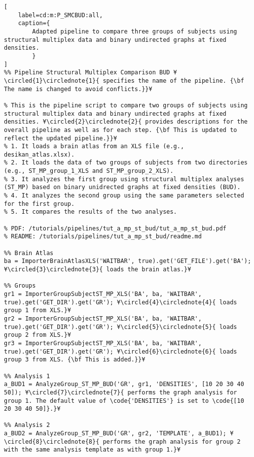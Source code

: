 \documentclass{tufte-handout}
\begin{document}
\begin{lstlisting}[
	label=cd:m:P_SMCBUD:all,
	caption={
		Adapted pipeline to compare three groups of subjects using structural multiplex data and binary undirected graphs at fixed densities.
		}
]
%% Pipeline Structural Multiplex Comparison BUD ¥\circled{1}\circlednote{1}{ specifies the name of the pipeline. {\bf The name is changed to avoid conflicts.}}¥

% This is the pipeline script to compare two groups of subjects using structural multiplex data and binary undirected graphs at fixed densities. ¥\circled{2}\circlednote{2}{ provides descriptions for the overall pipeline as well as for each step. {\bf This is updated to reflect the updated pipeline.}}¥
% 1. It loads a brain atlas from an XLS file (e.g., desikan_atlas.xlsx).
% 2. It loads the data of two groups of subjects from two directories (e.g., ST_MP_group_1_XLS and ST_MP_group_2_XLS).
% 3. It analyzes the first group using structural multiplex analyses (ST_MP) based on binary unidrected graphs at fixed densities (BUD).
% 4. It analyzes the second group using the same parameters selected for the first group.
% 5. It compares the results of the two analyses.

% PDF: /tutorials/pipelines/tut_a_mp_st_bud/tut_a_mp_st_bud.pdf
% README: /tutorials/pipelines/tut_a_mp_st_bud/readme.md

%% Brain Atlas
ba = ImporterBrainAtlasXLS('WAITBAR', true).get('GET_FILE').get('BA'); ¥\circled{3}\circlednote{3}{ loads the brain atlas.}¥

%% Groups
gr1 = ImporterGroupSubjectST_MP_XLS('BA', ba, 'WAITBAR', true).get('GET_DIR').get('GR'); ¥\circled{4}\circlednote{4}{ loads group 1 from XLS.}¥
gr2 = ImporterGroupSubjectST_MP_XLS('BA', ba, 'WAITBAR', true).get('GET_DIR').get('GR'); ¥\circled{5}\circlednote{5}{ loads group 2 from XLS.}¥
gr3 = ImporterGroupSubjectST_MP_XLS('BA', ba, 'WAITBAR', true).get('GET_DIR').get('GR'); ¥\circled{6}\circlednote{6}{ loads group 3 from XLS. {\bf This is added.}}¥

%% Analysis 1
a_BUD1 = AnalyzeGroup_ST_MP_BUD('GR', gr1, 'DENSITIES', [10 20 30 40 50]); ¥\circled{7}\circlednote{7}{ performs the graph analysis for group 1. The default value of \code{'DENSITIES'} is set to \code{[10 20 30 40 50]}.}¥

%% Analysis 2
a_BUD2 = AnalyzeGroup_ST_MP_BUD('GR', gr2, 'TEMPLATE', a_BUD1); ¥\circled{8}\circlednote{8}{ performs the graph analysis for group 2 with the same analysis template as with group 1.}¥


\end{lstlisting}
\end{document}
